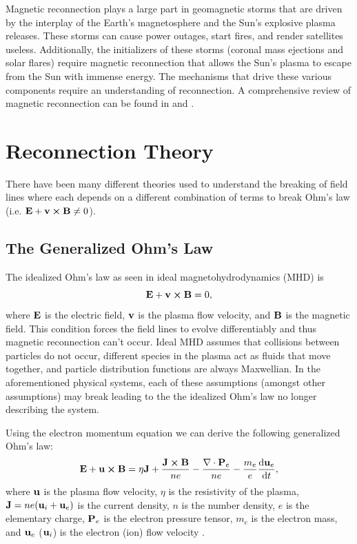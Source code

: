 Magnetic reconnection plays a large part in geomagnetic storms that are driven by the interplay of the Earth's magnetosphere and the Sun's explosive plasma releases. These storms can cause power outages, start fires, and render satellites useless. Additionally, the initializers of these storms (coronal mass ejections and solar flares) require magnetic reconnection that allows the Sun's plasma to escape from the Sun with immense energy. The mechanisms that drive these various components require an understanding of reconnection. A comprehensive review of magnetic reconnection can be found in \cite{Yamada_Kulsrud_Ji_2010} and \cite{Zweibel_Yamada_2009}.

\section{Reconnection Theory}

There have been many different theories used to understand the breaking of field lines where each depends on a different combination of terms to break Ohm's law (i.e. $\vb{E} + \vb{v} \cross \vb{B} \neq 0$).

\subsection{The Generalized Ohm's Law}

The idealized Ohm's law as seen in ideal magnetohydrodynamics (MHD) is
\begin{equation}
  \vb{E} + \vb{v} \cross \vb{B} = 0,
\end{equation}
where $\vb{E}$ is the electric field, $\vb{v}$ is the plasma flow velocity, and $\vb{B}$ is the magnetic field. This condition forces the field lines to evolve differentiably and thus magnetic reconnection can't occur. Ideal MHD assumes that collisions between particles do not occur, different species in the plasma act as fluids that move together, and particle distribution functions are always Maxwellian. In the aforementioned physical systems, each of these assumptions (amongst other assumptions) may break leading to the the idealized Ohm's law no longer describing the system.

Using the electron momentum equation we can derive the following generalized Ohm's law:
\begin{equation}
  \vb{E} + \vb{u} \cross \vb{B} = \eta \vb{J} + \frac{\vb{J}\cross\vb{B}}{ne} - \frac{\nabla \cdot\vb{P}_e}{ne}-\frac{m_e}{e}\dv{\vb{u}_e}{t},
  \label{eq:generalized_ohms_law}
\end{equation} %
where $\vb{u}$ is the plasma flow velocity, $\eta$ is the resistivity of the plasma, $\vb{J} = ne(\vb{u}_i + \vb{u}_e)$ is the current density, $n$ is the number density, $e$ is the elementary charge, $\vb{P}_e$ is the electron pressure tensor, $m_e$ is the electron mass, and $\vb{u}_e$ ($\vb{u}_i$) is the electron (ion) flow velocity \cite{Zweibel_Yamada_2016}.


